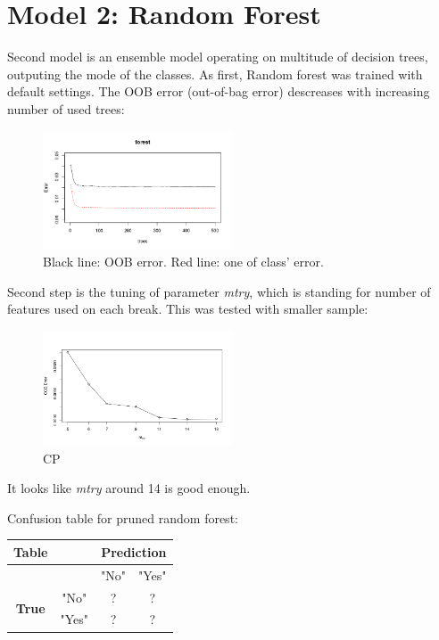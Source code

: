 \documentclass[%
 aip,
 jmp,%
 amsmath,amssymb,
 reprint,%
]{revtex4-1}
\begin{document}
\newpage

\section{Model 2: Random Forest}

Second model is an ensemble model operating on multitude of decision trees, outputing the mode of the classes. As first, Random forest was trained with default settings. The OOB error (out-of-bag error) descreases with increasing number of used trees:

\begin{figure}[h]
	\centering

	\includegraphics[width=0.5\textwidth]{graphics/forest-error.png}

	\caption{Black line: OOB error. Red line: one of class' error.}
\end{figure}

Second step is the tuning of parameter \textit{mtry}, which is standing for number of features used on each break. This was tested with smaller sample:

\begin{figure}[h]
	\centering

	\includegraphics[width=0.5\textwidth]{graphics/OOB.png}

	\caption{CP}
\end{figure}

It looks like \textit{mtry} around 14 is good enough.

Confusion table for pruned random forest:

\begin{center}
	\begin{tabular}{c|c|c c|}
	    \textbf{Table}  & & \multicolumn{2}{|c|}{\textbf{Prediction}} \\
		\hline
		  & & "No" & "Yes"\\
		\hline
		\multirow{2}{4em}{\textbf{True}} & "No" & ? & ? \\
		  & "Yes" & ? & ? \\
		\hline
	\end{tabular}
\end{center}
\end{document}

